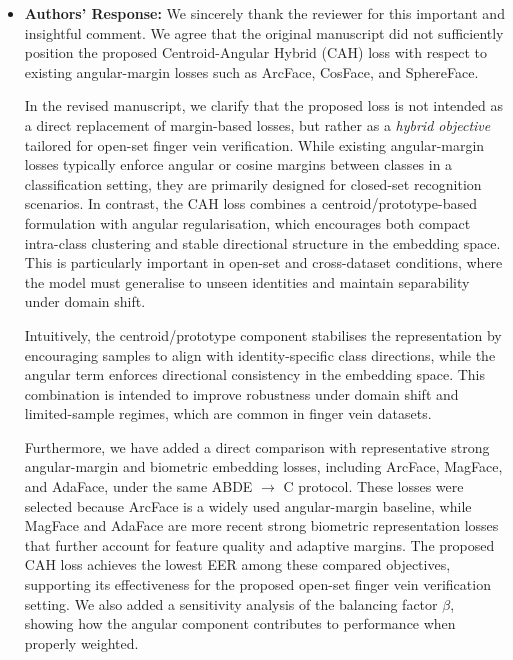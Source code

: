 \documentclass[11pt]{article}
\theoremstyle{remark}
\begin{document}
\begin{itemize}
	\item \textbf{Authors' Response:} 
	We sincerely thank the reviewer for this important and insightful comment. We agree that the original manuscript did not sufficiently position the proposed Centroid-Angular Hybrid (CAH) loss with respect to existing angular-margin losses such as ArcFace, CosFace, and SphereFace.

	In the revised manuscript, we clarify that the proposed loss is not intended as a direct replacement of margin-based losses, but rather as a \emph{hybrid objective} tailored for open-set finger vein verification. While existing angular-margin losses typically enforce angular or cosine margins between classes in a classification setting, they are primarily designed for closed-set recognition scenarios. In contrast, the CAH loss combines a centroid/prototype-based formulation with angular regularisation, which encourages both compact intra-class clustering and stable directional structure in the embedding space. This is particularly important in open-set and cross-dataset conditions, where the model must generalise to unseen identities and maintain separability under domain shift.

	Intuitively, the centroid/prototype component stabilises the representation by encouraging samples to align with identity-specific class directions, while the angular term enforces directional consistency in the embedding space. This combination is intended to improve robustness under domain shift and limited-sample regimes, which are common in finger vein datasets.

	Furthermore, we have added a direct comparison with representative strong angular-margin and biometric embedding losses, including ArcFace, MagFace, and AdaFace, under the same ABDE $\rightarrow$ C protocol. These losses were selected because ArcFace is a widely used angular-margin baseline, while MagFace and AdaFace are more recent strong biometric representation losses that further account for feature quality and adaptive margins. The proposed CAH loss achieves the lowest EER among these compared objectives, supporting its effectiveness for the proposed open-set finger vein verification setting. We also added a sensitivity analysis of the balancing factor $\beta$, showing how the angular component contributes to performance when properly weighted.


\end{itemize}
\end{document}
